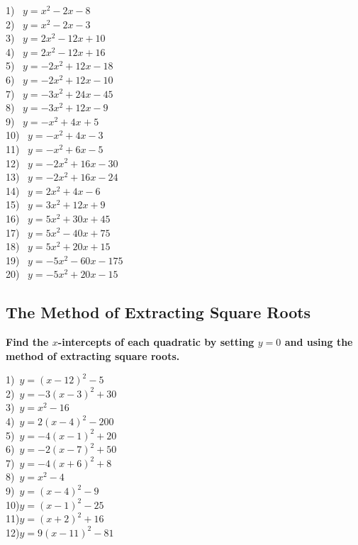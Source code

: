\documentclass[12pt]{book}
\theoremstyle{definition}
\begin{document}
\begin{multicols}{3}
  1)~ $y = x^2 - 2 x - 8$\\
  2)~ $y = x^2 - 2 x - 3$\\
  3)~ $y = 2 x^2 - 12 x + 10$\\
  4)~ $y = 2 x^2 - 12 x + 16$\\
  5)~ $y = - 2 x^2 + 12 x - 18$\\
  6)~ $y = - 2 x^2 + 12 x - 10$\\
  7)~ $y = - 3 x^2 + 24 x - 45$\\
  8)~ $y = - 3 x^2 + 12 x - 9$\\
  9)~ $y = - x^2 + 4 x_{} + 5$\\
  10)~ $y = - x^2 + 4 x - 3$\\
  11)~ $y = - x^2 + 6 x - 5$\\
  12)~ $y = - 2 x^2 + 16 x - 30$\\
  13)~ $y = - 2 x^2 + 16 x - 24$\\
  14)~ $y = 2 x^2 + 4 x - 6$\\
  15)~ $y = 3 x^2 + 12 x + 9$\\
  16)~ $y = 5 x^2 + 30 x + 45$\\
  17)~ $y = 5 x^2 - 40 x + 75$\\
  18)~ $y = 5 x^2 + 20 x + 15$\\
  19)~ $y = - 5 x^2 - 60 x - 175$\\
  20)~ $y = - 5 x^2 + 20 x - 15$
\end{multicols}

\subsection*{The Method of Extracting Square Roots}

{\bf Find the $x$-intercepts of each quadratic by setting $y=0$ and using the method of extracting square roots.}

\begin{multicols}{3}
  1)~$y=(x-12)^2-5 $\\
  2)~$y=-3(x-3)^2+30 $\\
  3)~$y=x^2-16$\\
  4)~$y=2(x-4)^2 -200 $\\
  5)~$y=-4(x-1)^2+20$\\
  6)~$y=-2(x-7)^2+50$\\
  7)~$y=-4(x+6)^2+8$\\
  8)~$y=x^2-4$\\
  9)~$y=(x-4)^2-9$\\
  10)$y=(x-1)^2-25 $\\
  11)$y=(x+2)^2+16$\\
  12)$y=9(x-11)^2-81$
\end{multicols}
\end{document}
